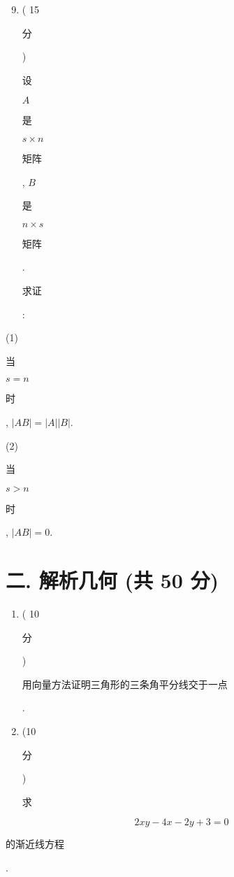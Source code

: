 \documentclass[10pt]{article}
\begin{document}
\begin{enumerate}
  \setcounter{enumi}{8}
  \item ( 15 \begin{CJK}{UTF8}{mj}分\end{CJK}) \begin{CJK}{UTF8}{mj}设\end{CJK} $A$ \begin{CJK}{UTF8}{mj}是\end{CJK} $s \times n$ \begin{CJK}{UTF8}{mj}矩阵\end{CJK}, $B$ \begin{CJK}{UTF8}{mj}是\end{CJK} $n \times s$ \begin{CJK}{UTF8}{mj}矩阵\end{CJK}. \begin{CJK}{UTF8}{mj}求证\end{CJK}:
\end{enumerate}
(1) \begin{CJK}{UTF8}{mj}当\end{CJK} $s=n$ \begin{CJK}{UTF8}{mj}时\end{CJK}, $|A B|=|A||B|$.

(2) \begin{CJK}{UTF8}{mj}当\end{CJK} $s>n$ \begin{CJK}{UTF8}{mj}时\end{CJK}, $|A B|=0$.

\section{二. 解析几何 (共 50 分)}
\begin{enumerate}
  \item ( 10 \begin{CJK}{UTF8}{mj}分\end{CJK}) \begin{CJK}{UTF8}{mj}用向量方法证明三角形的三条角平分线交于一点\end{CJK}.

  \item (10 \begin{CJK}{UTF8}{mj}分\end{CJK}) \begin{CJK}{UTF8}{mj}求\end{CJK}

\end{enumerate}
$$
2 x y-4 x-2 y+3=0
$$
\begin{CJK}{UTF8}{mj}的渐近线方程\end{CJK}.
\end{document}
